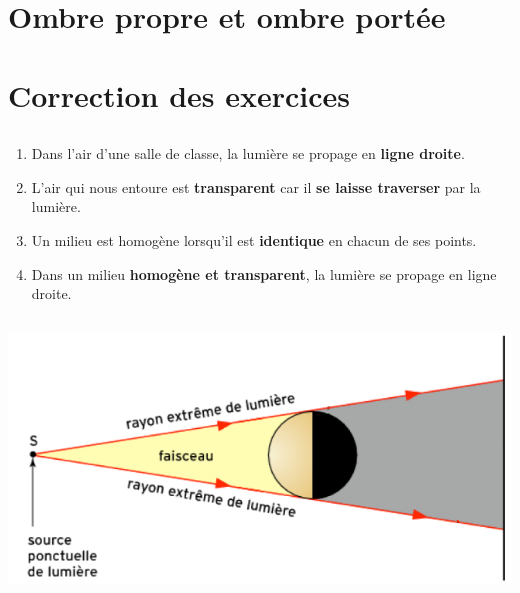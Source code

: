 \documentclass[12pt,a4paper]{article}
\begin{document}
\section{Ombre propre et ombre portée}








\begin{myexos}
\end{myexos}
\appendix

\newpage

\section*{Correction des exercices}

\subsection*{}

\begin{enumerate}[label=\alph*)]
	\item Dans l'air d'une salle de classe, la lumière se propage en \textbf{ligne droite}.
	\item L'air qui nous entoure est \textbf{transparent} car il \textbf{se laisse traverser} par la lumière.
	\item Un milieu est homogène lorsqu'il est \textbf{identique} en chacun de ses points.
	\item Dans un milieu \textbf{homogène et transparent}, la lumière se propage en ligne droite.
\end{enumerate}

\subsection*{}
	\begin{center}
		\includegraphics[scale=0.7]{exo2}
	\end{center}
\end{document}

